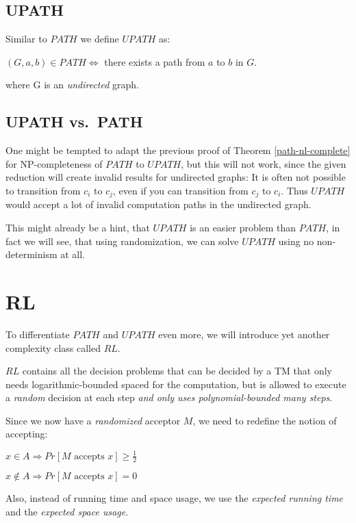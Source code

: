 \section{UPATH}\label{upath}

Similar to $PATH$ we define $UPATH$ as:

$(G, a, b) \in PATH \Leftrightarrow $ there exists a path from $a$ to
$b$ in $G$.

where G is an \emph{undirected} graph.

\section{UPATH vs.~PATH}\label{upath-vs.path}

One might be tempted to adapt the previous proof of Theorem
\ref{path-nl-complete} for NP-completeness of $PATH$ to $UPATH$, but
this will not work, since the given reduction will create invalid
results for undirected graphs: It is often not possible to transition
from $c_i$ to $c_j$, even if you can transition from $c_j$ to $c_i$.
Thus $UPATH$ would accept a lot of invalid computation paths in the
undirected graph.

This might already be a hint, that $UPATH$ is an easier problem than
$PATH$, in fact we will see, that using randomization, we can solve
$UPATH$ using no non-determinism at all.

\chapter{RL}\label{rl}

To differentiate $PATH$ and $UPATH$ even more, we will introduce yet
another complexity class called $RL$.

$RL$ contains all the decision problems that can be decided by a TM that
only needs logarithmic-bounded spaced for the computation, but is
allowed to execute a \emph{random} decision at each step \emph{and only
uses polynomial-bounded many steps}.

Since we now have a \emph{randomized} acceptor $M$, we need to redefine
the notion of accepting:

$x \in A \Rightarrow Pr[M \text{ accepts } x] \geq \frac{1}{2}$

$x \not \in A \Rightarrow Pr[M \text{ accepts } x] = 0$

Also, instead of running time and space usage, we use the \emph{expected
running time} and the \emph{expected space usage}.

